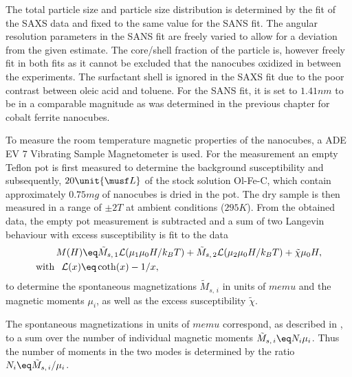 \documentclass[\main/dresen_thesis.tex]{subfiles}
\begin{document}
    The total particle size and particle size distribution is determined by the fit of the SAXS data and fixed to the same value for the SANS fit.
    The angular resolution parameters in the SANS fit are freely varied to allow for a deviation from the given estimate.
    The core/shell fraction of the particle is, however freely fit in both fits as it cannot be excluded that the nanocubes oxidized in between the experiments.
    The surfactant shell is ignored in the SAXS fit due to the poor contrast between oleic acid and toluene.
    For the SANS fit, it is set to $1.41 \unit{nm}$ to be in a comparable magnitude as was determined in the previous chapter  for cobalt ferrite nanocubes.

    To measure the room temperature magnetic properties of the nanocubes, a ADE EV 7 Vibrating Sample Magnetometer is used.
    For the measurement an empty Teflon pot is first measured to determine the background susceptibility and subsequently, $20 \unit{\musf L}$ of the stock solution Ol-Fe-C, which contain approximately $0.75 \unit{mg}$ of nanocubes is dried in the pot.
    The dry sample is then measured in a range of $\pm 2 \unit{T}$ at ambient conditions ($295 \unit{K}$).
    From the obtained data, the empty pot measurement is subtracted and a sum of two Langevin behaviour with excess susceptibility is fit to the data
    \begin{align}
      \begin{split}
        &M(H) \eq \tilde{M}_{s,\,1} \mathcal{L}( \mu_1 \mu_0 H / k_B T) + \tilde{M}_{s,\,2}  \mathcal{L}(  \mu_2 \mu_0 H / k_B T) + \tilde{\chi} \mu_0H,\\
        \mathrm{with\,} & \hspace{0.2cm} \mathcal{L}(x) \eq \coth(x) - 1/x,
      \end{split}
    \end{align}
    to determine the spontaneous magnetizations $\tilde{M}_{s,\,i}$ in units of $\unit{memu}$ and the magnetic moments $\mu_i$, as well as the excess susceptibility $\tilde{\chi}$.
    
    The spontaneous magnetizations in units of $\unit{memu}$ correspond, as described in , to a sum over the number of individual magnetic moments $\tilde{M}_{s,\,i} \eq N_i \mu_i$.
    Thus the number of moments in the two modes is determined by the ratio $N_i \eq \tilde{M}_{s,\,i} / \mu_i$.
\end{document}
